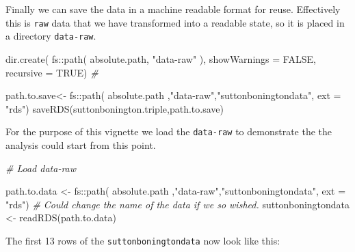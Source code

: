 \documentclass{article}
\newenvironment{Shaded}{\begin{snugshade}}{\end{snugshade}}
\newcommand{\AttributeTok}[1]{\textcolor[rgb]{0.77,0.63,0.00}{#1}}
\newcommand{\CommentTok}[1]{\textcolor[rgb]{0.56,0.35,0.01}{\textit{#1}}}
\newcommand{\ConstantTok}[1]{\textcolor[rgb]{0.00,0.00,0.00}{#1}}
\newcommand{\FunctionTok}[1]{\textcolor[rgb]{0.00,0.00,0.00}{#1}}
\newcommand{\NormalTok}[1]{#1}
\newcommand{\OtherTok}[1]{\textcolor[rgb]{0.56,0.35,0.01}{#1}}
\newcommand{\SpecialCharTok}[1]{\textcolor[rgb]{0.00,0.00,0.00}{#1}}
\newcommand{\StringTok}[1]{\textcolor[rgb]{0.31,0.60,0.02}{#1}}
\begin{document}
Finally we can save the data in a machine readable format for reuse. Effectively this is \texttt{raw} data that we have transformed into a readable state, so it is placed in a directory \texttt{data-raw}.

\begin{Shaded}
\begin{Highlighting}[]
\FunctionTok{dir.create}\NormalTok{( }
\NormalTok{          fs}\SpecialCharTok{::}\FunctionTok{path}\NormalTok{( absolute.path,}
            \StringTok{"data{-}raw"}\NormalTok{ ),  }
            \AttributeTok{showWarnings =} \ConstantTok{FALSE}\NormalTok{,}
            \AttributeTok{recursive =} \ConstantTok{TRUE}\NormalTok{) }\CommentTok{\# }

\NormalTok{path.to.save}\OtherTok{\textless{}{-}}\NormalTok{ fs}\SpecialCharTok{::}\FunctionTok{path}\NormalTok{( absolute.path}
\NormalTok{                               ,}\StringTok{"data{-}raw"}\NormalTok{,}\StringTok{"suttonboningtondata"}\NormalTok{, }\AttributeTok{ext =} \StringTok{"rds"}\NormalTok{)}
\FunctionTok{saveRDS}\NormalTok{(suttonbonington.triple,path.to.save)}
\end{Highlighting}
\end{Shaded}

For the purpose of this vignette we load the \texttt{data-raw} to demonstrate the the analysis could start from this point.

\begin{Shaded}
\begin{Highlighting}[]
\CommentTok{\# Load data{-}raw}

\NormalTok{path.to.data }\OtherTok{\textless{}{-}}\NormalTok{ fs}\SpecialCharTok{::}\FunctionTok{path}\NormalTok{( absolute.path}
\NormalTok{                               ,}\StringTok{"data{-}raw"}\NormalTok{,}\StringTok{"suttonboningtondata"}\NormalTok{, }\AttributeTok{ext =} \StringTok{"rds"}\NormalTok{)}
\CommentTok{\# Could change the name of the data if we so wished.}
\NormalTok{suttonboningtondata }\OtherTok{\textless{}{-}}  \FunctionTok{readRDS}\NormalTok{(path.to.data)}
\end{Highlighting}
\end{Shaded}

The first 13 rows of the \texttt{suttonboningtondata} now look like this:
\end{document}
